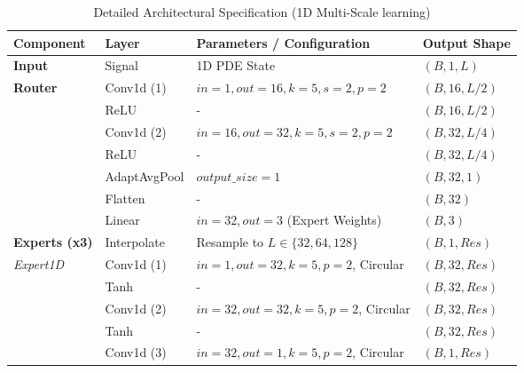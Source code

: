 \documentclass[preprint,12pt,authoryear]{elsarticle}
\begin{document}
\begin{table}[h]
\centering
\caption{Detailed Architectural Specification (1D Multi-Scale learning)}
\label{tab:architecture}
\begin{tabular}{@{}llll@{}}
\toprule
\textbf{Component} & \textbf{Layer} & \textbf{Parameters / Configuration} & \textbf{Output Shape} \\ \midrule
\textbf{Input} & Signal & 1D PDE State & $(B, 1, L)$ \\ \midrule
\textbf{Router} & Conv1d (1) & $in=1, out=16, k=5, s=2, p=2$ & $(B, 16, L/2)$ \\
 & ReLU & - & $(B, 16, L/2)$ \\
 & Conv1d (2) & $in=16, out=32, k=5, s=2, p=2$ & $(B, 32, L/4)$ \\
 & ReLU & - & $(B, 32, L/4)$ \\
 & AdaptAvgPool & $output\_size=1$ & $(B, 32, 1)$ \\
 & Flatten & - & $(B, 32)$ \\
 & Linear & $in=32, out=3$ (Expert Weights) & $(B, 3)$ \\ \midrule
\textbf{Experts (x3)} & Interpolate & Resample to $L \in \{32, 64, 128\}$ & $(B, 1, Res)$ \\
\textit{Expert1D} & Conv1d (1) & $in=1, out=32, k=5, p=2$, Circular & $(B, 32, Res)$ \\
 & Tanh & - & $(B, 32, Res)$ \\
 & Conv1d (2) & $in=32, out=32, k=5, p=2$, Circular & $(B, 32, Res)$ \\
 & Tanh & - & $(B, 32, Res)$ \\
 & Conv1d (3) & $in=32, out=1, k=5, p=2$, Circular & $(B, 1, Res)$ \\ \bottomrule
\end{tabular}
\end{table}
\end{document}
